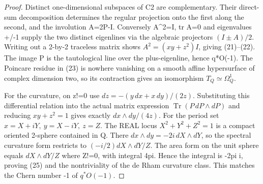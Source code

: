 \documentclass[11pt]{article}
\begin{document}
\begin{proof}
Distinct one-dimensional
subspaces of C2 are
complementary. Their
direct-sum decomposition
determines the regular
projection onto the
first along the second,
and the involution
A=2P-I. Conversely
A^2=I, tr A=0 and
eigenvalues +/-1
supply the two distinct
eigenlines via
the algebraic projectors
$(I\pm A)/2$.
Writing out a 2-by-2
traceless matrix shows
$A^2=(xy+z^2)I$,
giving (21)--(22).
The image P is the
tautological line over
the plus-eigenline,
hence q*O(-1).
The Poincare residue
in (23) is nowhere
vanishing on a smooth
affine hypersurface of
complex dimension two,
so its contraction
gives an isomorphism
$T_Q\simeq\Omega_Q^1$.

For the curvature,
on z!=0 use
$dz=-(y\,dx+x\,dy)/(2z)$.
Substituting this
differential relation
into the actual
matrix expression
$\operatorname{Tr}
(P\,dP\wedge dP)$
and reducing
$xy+z^2=1$
gives exactly
$dx\wedge dy/(4z)$.
For the period set
$x=X+iY,\ y=X-iY,\ z=Z$.
The REAL locus
$X^2+Y^2+Z^2=1$
is a compact oriented
2-sphere contained in Q.
There
$dx\wedge dy=-2i\,dX\wedge dY$,
so the spectral
curvature form restricts
to $(-i/2)dX\wedge dY/Z$.
The area form on
the unit sphere equals
$dX\wedge dY/Z$
where Z!=0, with
integral 4pi. Hence
the integral is -2pi i,
proving (25) and
the nontriviality
of the de Rham
curvature class.
This matches the
Chern number -1 of
$q^*O(-1)$.
\end{proof}
\end{document}
